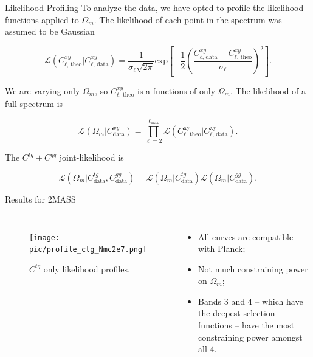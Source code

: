 \documentclass[serif, aspectratio=169]{beamer}
\begin{document}
\begin{frame}{Likelihood Profiling}
    To analyze the data, we have opted to profile the likelihood functions applied to $\Omega_m$. The likelihood of each point in the spectrum was assumed to be Gaussian

    \begin{equation}\label{likelihood_cl}
    	\mathcal{L}(C_{\ell\text{, theo}}^{xy}|C_{\ell\text{, data}}^{xy})=\frac{1}{\sigma_\ell \sqrt{2\pi}}\text{exp}\left[-\frac{1}{2}\left(\frac{C_{\ell\text{, data}}^{xy}-C_{\ell\text{, theo}}^{xy}}{\sigma_\ell}\right)^2\right].
    \end{equation}

    We are varying only $\Omega_m$, so $C_{\ell\text{, theo}}^{xy}$ is a functions of only $\Omega_m$. The likelihood of a full spectrum is

    \begin{equation}\label{likelihood_cxy}
    	\mathcal{L}(\Omega_m|C^{xy}_\text{data})=\prod_{\ell=2}^{\ell_\text{max}} \mathcal{L}(C_{\ell\text{, theo}}^\text{xy}|C_{\ell\text{, data}}^\text{xy}).
    \end{equation}

    The $C^{tg}+C^{gg}$ joint-likelihood is

    \begin{equation}
        \mathcal{L}(\Omega_m|C^{tg}_\text{data},C^{gg}_\text{data})=\mathcal{L}(\Omega_m|C^{tg}_\text{data})\mathcal{L}(\Omega_m|C^{gg}_\text{data}).
    \end{equation}
\end{frame}

\begin{frame}{Results for 2MASS}
    \begin{columns}
        \begin{figure}
            \centering
            \texttt{[image: pic/profile\_ctg\_Nmc2e7.png]}
            \caption{$C^{tg}$ only likelihood profiles.}
            \label{fig:prof_ctg}
    \end{figure}
        \begin{itemize}
            \item All curves are compatible with Planck;
            \item Not much constraining power on $\Omega_m$;
            \item Bands 3 and 4 -- which have the deepest selection functions -- have the most constraining power amongst all 4.
        \end{itemize}
    \end{columns}
\end{frame}
\end{document}
